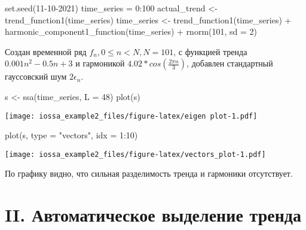 \documentclass[
]{article}
\newenvironment{Shaded}{\begin{snugshade}}{\end{snugshade}}
\newcommand{\AttributeTok}[1]{\textcolor[rgb]{0.77,0.63,0.00}{#1}}
\newcommand{\DecValTok}[1]{\textcolor[rgb]{0.00,0.00,0.81}{#1}}
\newcommand{\FunctionTok}[1]{\textcolor[rgb]{0.00,0.00,0.00}{#1}}
\newcommand{\NormalTok}[1]{#1}
\newcommand{\OtherTok}[1]{\textcolor[rgb]{0.56,0.35,0.01}{#1}}
\newcommand{\SpecialCharTok}[1]{\textcolor[rgb]{0.00,0.00,0.00}{#1}}
\newcommand{\StringTok}[1]{\textcolor[rgb]{0.31,0.60,0.02}{#1}}
\begin{document}
\begin{Shaded}
\begin{Highlighting}[]
  \FunctionTok{set.seed}\NormalTok{(}\DecValTok{11{-}10{-}2021}\NormalTok{)}
\NormalTok{  time\_series }\OtherTok{=} \DecValTok{0}\SpecialCharTok{:}\DecValTok{100}
\NormalTok{  actual\_trend }\OtherTok{\textless{}{-}} \FunctionTok{trend\_function1}\NormalTok{(time\_series)}
\NormalTok{  time\_series }\OtherTok{\textless{}{-}} \FunctionTok{trend\_function1}\NormalTok{(time\_series) }\SpecialCharTok{+} \FunctionTok{harmonic\_component1\_function}\NormalTok{(time\_series) }\SpecialCharTok{+} \FunctionTok{rnorm}\NormalTok{(}\DecValTok{101}\NormalTok{, }\AttributeTok{sd =} \DecValTok{2}\NormalTok{)}
\end{Highlighting}
\end{Shaded}

Создан временной ряд \(f_n , 0\leqslant n < N, N=101\), с функцией
тренда \(0.001n^2-0.5n+3\) и гармоникой
\(4.02 * cos(\frac{2\pi n}{3})\), добавлен стандартный гауссовский шум
\(2 \epsilon_n\).

\begin{Shaded}
\begin{Highlighting}[]
\NormalTok{  s }\OtherTok{\textless{}{-}} \FunctionTok{ssa}\NormalTok{(time\_series, }\AttributeTok{L =} \DecValTok{48}\NormalTok{)}
  \FunctionTok{plot}\NormalTok{(s)}
\end{Highlighting}
\end{Shaded}

\texttt{[image: iossa\_example2\_files/figure-latex/eigen plot-1.pdf]}

\begin{Shaded}
\begin{Highlighting}[]
  \FunctionTok{plot}\NormalTok{(s, }\AttributeTok{type =} \StringTok{"vectors"}\NormalTok{, }\AttributeTok{idx =} \DecValTok{1}\SpecialCharTok{:}\DecValTok{10}\NormalTok{)}
\end{Highlighting}
\end{Shaded}

\texttt{[image: iossa\_example2\_files/figure-latex/vectors\_plot-1.pdf]}

По графику видно, что сильная разделимость тренда и гармоники
отсутствует.

\hypertarget{ii.-ux430ux432ux442ux43eux43cux430ux442ux438ux447ux435ux441ux43aux43eux435-ux432ux44bux434ux435ux43bux435ux43dux438ux435-ux442ux440ux435ux43dux434ux430}{%
\section{II. Автоматическое выделение
тренда}\label{ii.-ux430ux432ux442ux43eux43cux430ux442ux438ux447ux435ux441ux43aux43eux435-ux432ux44bux434ux435ux43bux435ux43dux438ux435-ux442ux440ux435ux43dux434ux430}}
\end{document}
